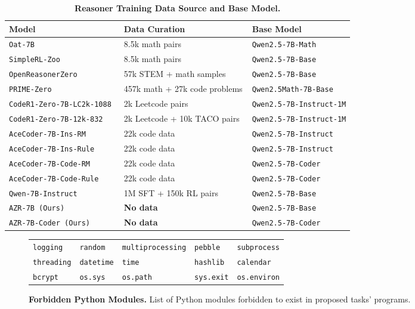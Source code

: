 \documentclass{article}
\begin{document}
\begin{table}[ht]
\centering
\small
\begin{tabular}{|l|l|l|}
\hline
\textbf{Model} & \textbf{Data Curation} & \textbf{Base Model} \\ \hline
\texttt{Oat-7B}~\citep{liu2025understanding} & 8.5k math pairs~\citep{hendrycks2021measuringmathematicalproblemsolving}  & \texttt{Qwen2.5-7B-Math} \\ \hline
\texttt{SimpleRL-Zoo}~\citep{zeng2025simplerl} & 8.5k math pairs~\citep{hendrycks2021measuringmathematicalproblemsolving} & \texttt{Qwen2.5-7B-Base} \\ \hline
\texttt{OpenReasonerZero}~\citep{hu2025open} & 57k STEM + math samples & \texttt{Qwen2.5-7B-Base} \\ \hline
\texttt{PRIME-Zero}~\citep{cui2025process} & 457k math + 27k code problems & \texttt{Qwen2.5Math-7B-Base} \\ \hline
\texttt{CodeR1-Zero-7B-LC2k-1088}~\citep{code-r1} & 2k Leetcode pairs & \texttt{Qwen2.5-7B-Instruct-1M} \\ \hline
\texttt{CodeR1-Zero-7B-12k-832}~\citep{code-r1} & 2k Leetcode + 10k TACO pairs~\citep{li2023taco} & \texttt{Qwen2.5-7B-Instruct-1M} \\ \hline
\texttt{AceCoder-7B-Ins-RM}~\citep{zeng2025acecoder} & 22k code data & \texttt{Qwen2.5-7B-Instruct} \\ \hline
\texttt{AceCoder-7B-Ins-Rule}~\citep{zeng2025acecoder} & 22k code data & \texttt{Qwen2.5-7B-Instruct} \\ \hline
\texttt{AceCoder-7B-Code-RM}~\citep{zeng2025acecoder} & 22k code data & \texttt{Qwen2.5-7B-Coder} \\ \hline
\texttt{AceCoder-7B-Code-Rule}~\citep{zeng2025acecoder} & 22k code data & \texttt{Qwen2.5-7B-Coder} \\ \hline
\texttt{Qwen-7B-Instruct}~\citep{yang2024qwen2} & 1M SFT + 150k RL pairs & \texttt{Qwen2.5-7B-Base} \\ \hline
\texttt{AZR-7B (Ours)} & \textbf{No data} & \texttt{Qwen2.5-7B-Base} \\ \hline
\texttt{AZR-7B-Coder (Ours)} & \textbf{No data} & \texttt{Qwen2.5-7B-Coder} \\ \hline
\end{tabular}
\caption{\textbf{Reasoner Training Data Source and Base Model.}}
\label{tab:model_config}
\end{table}

\begin{figure}[ht]
\centering
\begin{tabular}{lllll}
\texttt{logging} & \texttt{random} & \texttt{multiprocessing} & \texttt{pebble} & \texttt{subprocess} \\ \texttt{threading} &
\texttt{datetime} & \texttt{time} & \texttt{hashlib} &
\texttt{calendar} \\ \texttt{bcrypt} & \texttt{os.sys} &
\texttt{os.path} & \texttt{sys.exit} & \texttt{os.environ} \\
\end{tabular}
\caption{\textbf{Forbidden Python Modules.} List of Python modules forbidden to exist in proposed tasks' programs.}
\label{fig:forbidden}
\end{figure}
\end{document}
